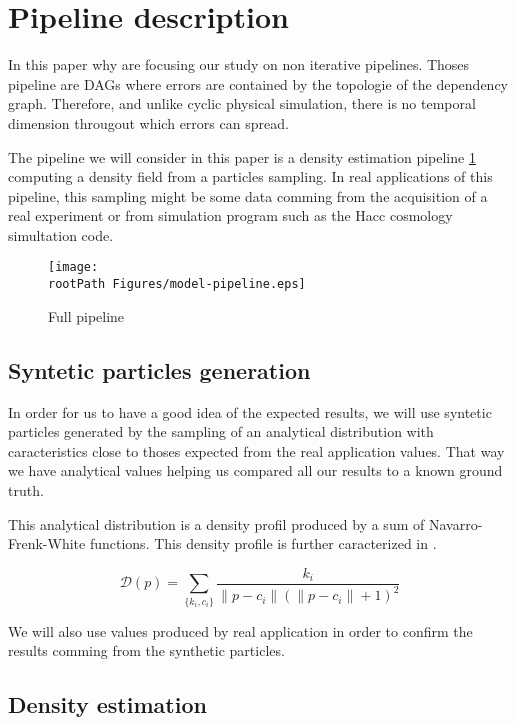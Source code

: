 \documentclass[10pt,a4paper,twoside,twocolumn]{article}
\newcommand*{\rootPath}{../}
\begin{document}
\section{Pipeline description}

In this paper why are focusing our study on non iterative pipelines. Thoses
pipeline are DAGs where errors are contained by the topologie of the dependency
graph. Therefore, and unlike cyclic physical simulation, there is no temporal
dimension througout which errors can spread.

The pipeline we will consider in this paper is a density estimation pipeline
\ref{fig:pipeline} computing a density field from a particles sampling. In real
applications of this pipeline, this sampling might be some data comming from the
acquisition of a real experiment or from simulation program such as the Hacc
cosmology simultation code.

\begin{figure}[!ht]
	\centering
	\texttt{[image: \\rootPath Figures/model-pipeline.eps]}
	\caption{Full pipeline}
	\label{fig:pipeline}
\end{figure}

\subsection{Syntetic particles generation}

In order for us to have a good idea of the expected results, we will use
syntetic particles generated by the sampling of an analytical distribution with
caracteristics close to thoses expected from the real application values. That
way we have analytical values helping us compared all our results to a known
ground truth.

This analytical distribution is a density profil produced by a sum of
Navarro-Frenk-White functions\cite{navarro96}. This density profile is further
caracterized in .

\begin{equation}
	\mathcal D(p) = \sum_{\{k_i, c_i\}} \frac{k_i}{\|p-c_i\|(\|p-c_i\|+1)^2}
\end{equation}

We will also use values produced by real application in order to confirm the
results comming from the synthetic particles.

\subsection{Density estimation}
\end{document}
